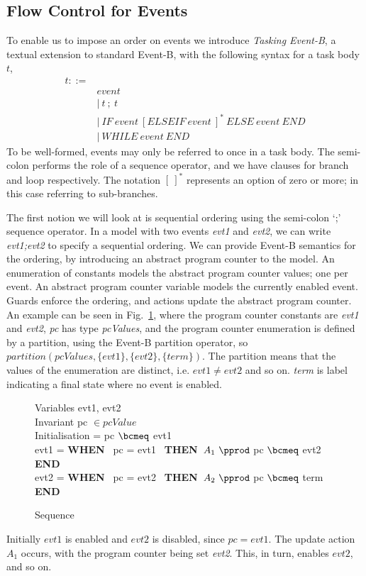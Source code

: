 
\subsection{Flow Control for Events}\label{flow}
To enable us to impose an order on events we introduce \emph{Tasking Event-B}, a textual extension to standard Event-B, with the following syntax for a task body $t$,
%
\begin{equation}
\begin{split}
t ::=&\\
& event\\
&\vert ~ t~;~t\\
&\vert ~ IF~ event~ [ELSEIF~ event~]^*~ ELSE~ event~ END\\
&\vert ~ WHILE~ event~ END
\end{split}
\end{equation}
%
To be well-formed, events may only be referred to once in a task body. The semi-colon performs the role of a sequence operator, and we have clauses for branch and loop respectively. The notation $[~]^*$ represents an option of zero or more; in this case referring to sub-branches.

The first notion we will look at is sequential ordering using the semi-colon `;' sequence operator. In a model with two events \emph{evt1} and \emph{evt2}, we can write \emph{evt1;evt2} to specify a sequential ordering. We can provide Event-B semantics for the ordering, by introducing an abstract program counter to the model. An enumeration of constants models the abstract program counter values; one per event. An abstract program counter variable models the currently enabled event. Guards enforce the ordering, and actions update the abstract program counter. An example can be seen in Fig.~\ref{fig:seq}, where the program counter constants are \emph{evt1} and \emph{evt2}, \emph{pc} has type \emph{pcValues}, and the program counter enumeration is defined by a partition, using the Event-B partition operator, so $partition(pcValues, \{evt1\}, \{evt2\},\{term\})$. The partition means that the values of the enumeration are distinct, i.e. $evt1 \neq evt2$ and so on. \emph{term} is label indicating a final state where no event is enabled.
%
\begin{figure}[b]
\centering
\begin{minipage}{0.7\textwidth}
Variables evt1, evt2\\
Invariant pc $\in pcValue$ \\
Initialisation = pc $\bcmeq$ evt1 \\
evt1 = \textbf{WHEN}~ pc = evt1~ \textbf{THEN}~$A_1~ \pprod$ pc $\bcmeq$ evt2 \textbf{END}\\
evt2 = \textbf{WHEN}~ pc = evt2~ \textbf{THEN}~$A_2~ \pprod$ pc $\bcmeq$ term \textbf{END}\\
\end{minipage}
\caption{Sequence}
\label{fig:seq}
\end{figure}
Initially $evt1$ is enabled and $evt2$ is disabled, since $pc = evt1$. The update action $A_1$ occurs, with the program counter being set \emph{evt2}. This, in turn, enables $evt2$, and so on.
